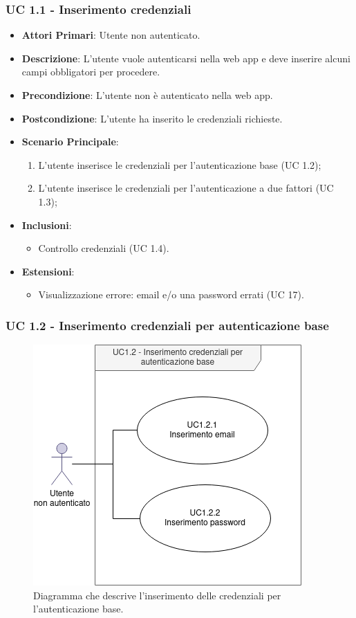 		\subsubsection{UC 1.1 - Inserimento credenziali}

		\begin{itemize}
			\item \textbf{Attori Primari}: Utente non autenticato.
			\item \textbf{Descrizione}: L'utente vuole autenticarsi nella web app e deve inserire alcuni campi obbligatori per procedere.
			\item \textbf{Precondizione}: L'utente non è autenticato nella web app.
			\item \textbf{Postcondizione}: L'utente ha inserito le credenziali richieste.
			\item \textbf{Scenario Principale}:
			\begin{enumerate}
				\item L'utente inserisce le credenziali per l'autenticazione base (UC 1.2);
				\item L'utente inserisce le credenziali per l'autenticazione a due fattori (UC 1.3);
			\end{enumerate}
			\item \textbf{Inclusioni}:
				\begin{itemize}
					\item Controllo credenziali (UC 1.4).
				\end{itemize}
			\item \textbf{Estensioni}:
				\begin{itemize}
					\item Visualizzazione errore: email e/o una password errati (UC 17).
				\end{itemize}
		\end{itemize}

		\subsubsection{UC 1.2 - Inserimento credenziali per autenticazione base}

		\begin{figure}[H]
			\centering
			\includegraphics[scale=0.675]{res/images/uc1.2}
			\caption{Diagramma che descrive l'inserimento delle credenziali per l'autenticazione base.}
		\end{figure}

